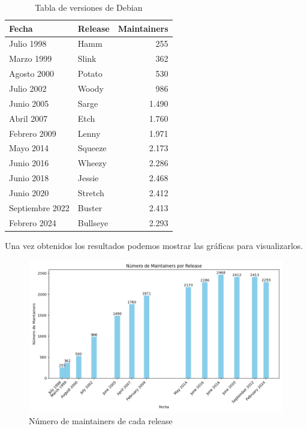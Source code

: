 \documentclass[a4paper, 12pt]{book}
\begin{document}
\begin{table}[h]
	\begin{center}
		\begin{tabular}{|l|l|r|} %
			\hline
			Fecha           & Release  & Maintainers \\ \hline
			Julio 1998      & Hamm     & 255         \\ \hline
			Marzo 1999      & Slink    & 362         \\ \hline
			Agosto 2000     & Potato   & 530         \\ \hline
			Julio 2002      & Woody    & 986         \\ \hline
			Junio 2005      & Sarge    & 1.490       \\ \hline
			Abril 2007      & Etch     & 1.760       \\ \hline
			Febrero 2009    & Lenny    & 1.971       \\ \hline
			Mayo 2014       & Squeeze  & 2.173       \\ \hline
			Junio 2016      & Wheezy   & 2.286       \\ \hline
			Junio 2018      & Jessie   & 2.468       \\ \hline
			Junio 2020      & Stretch  & 2.412       \\ \hline
			Septiembre 2022 & Buster   & 2.413       \\ \hline
			Febrero 2024    & Bullseye & 2.293       \\ \hline
		\end{tabular}
		\caption{Tabla de versiones de Debian}
	\end{center}
\end{table}



Una vez obtenidos los resultados podemos mostrar las gráficas para visualizarlos.
\begin{figure}
	\centering
	\includegraphics[width=15cm, keepaspectratio]{img/Figura2_buena_maintainers.png}
	\caption{Número de maintainers de cada release}
	\label{fig:mantenedores}
\end{figure}
\end{document}
